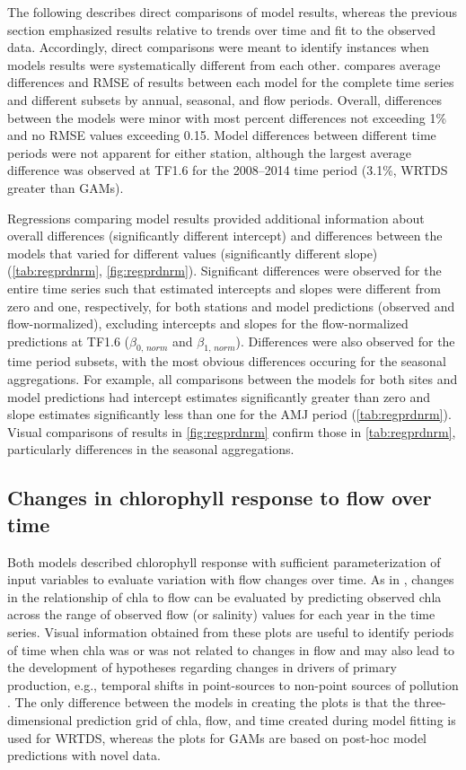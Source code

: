 \documentclass[letterpaper,12pt,oneside]{article}\usepackage[]{graphicx}\usepackage[]{color}
\begin{document}
The following describes direct comparisons of model results, whereas the previous section emphasized results relative to trends over time and fit to the observed data.  Accordingly, direct comparisons were meant to identify instances when models results were systematically different from each other.   compares average differences and \ac{RMSE} of results between each model for the complete time series and different subsets by annual, seasonal, and flow periods.  Overall, differences between the models were minor with most percent differences not exceeding 1\% and no \ac{RMSE} values exceeding 0.15.  Model differences between different time periods were not apparent for either station, although the largest average difference was observed at TF1.6 for the 2008--2014 time period (3.1\%, \ac{WRTDS} greater than \acp{GAM}).

Regressions comparing model results provided additional information about overall differences (significantly different intercept) and differences between the models that varied for different values (significantly different slope) (\cref{tab:regprdnrm}, \cref{fig:regprdnrm}).  Significant differences were observed for the entire time series such that estimated intercepts and slopes were different from zero and one, respectively, for both stations and model predictions (observed and flow-normalized), excluding intercepts and slopes for the flow-normalized predictions at TF1.6 ($\beta_{0,\,norm}$ and $\beta_{1,\,norm}$).  Differences were also observed for the time period subsets, with the most obvious differences occuring for the seasonal aggregations.  For example, all comparisons between the models for both sites and model predictions had intercept estimates significantly greater than zero and slope estimates significantly less than one for the \ac{AMJ} period (\cref{tab:regprdnrm}). Visual comparisons of results in \cref{fig:regprdnrm} confirm those in \cref{tab:regprdnrm}, particularly differences in the seasonal aggregations.

\subsection{Changes in chlorophyll response to flow over time}

Both models described chlorophyll response with sufficient parameterization of input variables to evaluate variation with flow changes over time.  As in \citet{Beck15}, changes in the relationship of \ac{chla} to flow can be evaluated by predicting observed \ac{chla} across the range of observed flow (or salinity) values for each year in the time series.  Visual information obtained from these plots are useful to identify periods of time when \ac{chla} was or was not related to changes in flow and may also lead to the development of hypotheses regarding changes in drivers of primary production, e.g., temporal shifts in point-sources to non-point sources of pollution \citep{Hirsch10,Beck15}.  The only difference between the models in creating the plots is that the three-dimensional prediction grid of \ac{chla}, flow, and time created during model fitting is used for \ac{WRTDS}, whereas the plots for \acp{GAM} are based on post-hoc model predictions with novel data. 
\end{document}
